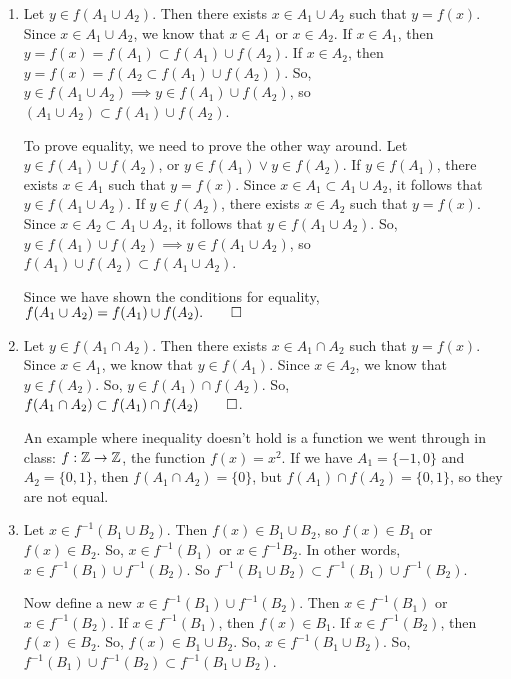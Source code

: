 \documentclass{report}
\begin{document}
\begin{enumerate}[label=\alph*.]
    \item Let $y \in f(A_1 \cup A_2)$. Then there exists $x \in A_1 \cup A_2$ such that $y = f(x)$. Since $x \in A_1 \cup A_2$, we know that $x \in A_1$ or $x \in A_2$. If $x \in A_1$, then $y = f(x) = f(A_1) \subset f(A_1) \cup f(A_2)$. If $x \in A_2$, then $y = f(x) = f(A_2 \subset f(A_1) \cup f(A_2))$. So, $y \in f(A_1 \cup A_2) \implies y \in f(A_1) \cup f(A_2)$, so $(A_1 \cup A_2) \subset f(A_1) \cup f(A_2)$.
    
    To prove equality, we need to prove the other way around. Let $y \in f(A_1) \cup f(A_2)$, or $y \in f(A_1) \lor y \in f(A_2)$. If $y \in f(A_1)$, there exists $x \in A_1$ such that $y=f(x)$. Since $x \in A_1 \subset A_1 \cup A_2$, it follows that $y \in f(A_1 \cup A_2)$. If $y \in f(A_2)$, there exists $x \in A_2$ such that $y=f(x)$. Since $x \in A_2 \subset A_1 \cup A_2$, it follows that $y \in f(A_1 \cup A_2)$. So, $y \in f(A_1) \cup f(A_2) \implies y \in f(A_1 \cup A_2)$, so $f(A_1) \cup f(A_2) \subset f(A_1 \cup A_2)$.

    Since we have shown the conditions for equality, $f(A_1 \cup A_2) = f(A_1) \cup f(A_2). \qed$
    \item Let $y \in f(A_1 \cap A_2)$. Then there exists $x \in A_1 \cap A_2$ such that $y = f(x)$. Since $x \in A_1$, we know that $y \in f(A_1)$. Since $x \in A_2$, we know that $y \in f(A_2)$. So, $y \in f(A_1) \cap f(A_2)$. So, $f(A_1 \cap A_2) \subset f(A_1) \cap f(A_2) \qed$.
    
    An example where inequality doesn't hold is a function we went through in class: $f : \ZZ \to \ZZ$, the function $f(x) = x^2$. If we have $A_1 = \{-1, 0\}$ and $A_2 = \{0, 1\}$, then $f(A_1 \cap A_2) = \{0\}$, but $f(A_1) \cap f(A_2) = \{0, 1\}$, so they are not equal. 
    \item Let $x \in f^{-1}(B_1 \cup B_2)$. Then $f(x) \in B_1 \cup B_2$, so $f(x) \in B_1$ or $f(x) \in B_2$. So, $x \in f^{-1}(B_1)$ or $x \in f^{-1}{B_2}$. In other words, $x\in f^{-1}(B_1) \cup f^{-1}(B_2)$. So $f^{-1}(B_1 \cup B_2) \subset f^{-1}(B_1) \cup f^{-1}(B_2)$.
    
    Now define a new $x \in f^{-1}(B_1) \cup f^{-1}(B_2)$. Then $x \in f^{-1}(B_1)$ or $x \in f^{-1}(B_2)$. If $x \in f^{-1}(B_1)$, then $f(x) \in B_1$. If $x \in f^{-1}(B_2)$, then $f(x) \in B_2$. So, $f(x) \in B_1 \cup B_2$. So, $x \in f^{-1}(B_1 \cup B_2)$. So, $f^{-1}(B_1) \cup f^{-1}(B_2) \subset f^{-1}(B_1 \cup B_2)$. 
    

\end{enumerate}
\end{document}
